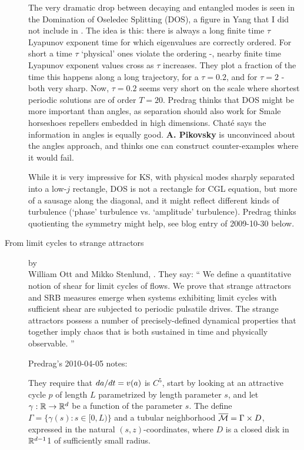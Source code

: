 \begin{description}
The very dramatic drop between decaying and entangled modes is
seen in the Domination of Oseledec Splitting (DOS), a figure in
Yang \etal{} that I did not include in
. The idea is this: there is always a
long finite time $\tau$ Lyapunov exponent time for which
eigenvalues are correctly ordered. For short a time $\tau$
`physical' ones violate the ordering -\ie, nearby finite time
Lyapunov exponent values cross as $\tau$ increases. They plot a
fraction of the time this happens along a long trajectory, for
a $\tau=0.2$, and for $\tau=2$ - both very sharp. Now,
$\tau=0.2$ seems very short on the scale where shortest
periodic solutions are of order $T=20$. Predrag thinks that DOS
might be more important than angles, as separation should also
work for Smale horseshoes repellers embedded in high
dimensions. Chat\'e says the information in angles is equally
good. {\bf A. Pikovsky} is unconvinced about the angles
approach, and thinks one can construct counter-examples where
it would fail.

While it is very impressive for KS, with physical modes sharply
separated into a low-$j$ rectangle, DOS is not a rectangle for
CGL equation, but more of a sausage along the diagonal, and it
might reflect different kinds of turbulence (`phase' turbulence
vs. `amplitude' turbulence). Predrag thinks quotienting the
symmetry might help, see blog entry of 2009-10-30 below.


\item[From limit cycles to strange attractors]
by \\
William Ott and Mikko Stenlund,
.
They say:
``
We define a quantitative notion of shear for limit cycles of
flows. We prove that strange attractors and SRB measures
emerge when systems exhibiting limit cycles with sufficient
shear are subjected to periodic pulsatile drives. The strange
attractors possess a number of precisely-defined dynamical
properties that together imply chaos that is both sustained
in time and physically observable.
''

Predrag's 2010-04-05 notes:

They require that $da/dt = v(a)$ is $C^5$, start by
looking at an attractive cycle $p$ of length $L$ parametrized
by length parameter $s$, and let $\gamma : \mathbb{R} \to
\mathbb{R}^d$ be a function of the parameter $s$. The define
$\Gamma = \{ \gamma(s) : s \in [0,L) \} $ and a tubular
neighborhood $\overline{{\cal M}} =\Gamma \times D$, expressed in
the natural $(s,z )$-coordinates, where $D$ is a closed disk
in $\mathbb{R}^{d-1}$1 of sufficiently small radius.


\end{description}
